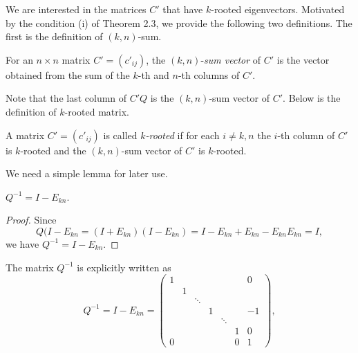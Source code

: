 \documentclass{beamer}
\begin{document}
\begin{frame}
    We are interested in the matrices $C'$ that have $k$-rooted eigenvectors.
Motivated by the condition (i) of Theorem 2.3, we provide the following two definitions.
The first is the definition of $(k,n)$-sum.
\begin{definition}
    For an $n \times n$ matrix $C'=(c'_{ij})$, the $(k, n)$-{\it sum vector} of $C'$ is the vector
     obtained from the sum of the $k$-th and  $n$-th columns of $C'$.
\end{definition}
Note that the last column of $C'Q$ is the $(k, n)$-sum vector of $C'$.
Below is the definition of $k$-rooted matrix.
\begin{definition}\label{m_rooted}
    A  matrix $C'=(c'_{ij})$ is called {\it $k$-rooted}  if for
     each $i\not=k, n$ the  $i$-th column of $C'$  is $k$-rooted
     and the $(k,n)$-sum vector of $C'$ is $k$-rooted.
\end{definition}
\end{frame}

\begin{frame}
    We need a simple lemma for later use.

\begin{lemma}
$Q^{-1}=I-E_{kn}.$
\end{lemma}

\begin{proof}
Since $$Q(I-E_{kn}=(I+E_{kn})(I-E_{kn})=I-E_{kn}+E_{kn}-E_{kn}E_{kn}=I,$$ we have
$Q^{-1}=I-E_{kn}$.
\end{proof}

\end{frame}

\begin{frame}
    The matrix $Q^{-1}$ is explicitly written as
    $$Q^{-1}=I-E_{kn}=
\begin{pmatrix}
1 &   &        &       &        &   & 0 \\
  & 1 &        &       &        &   &   \\
  &   & \ddots &       &        &   &   \\
  &   &        & 1     &        &   & -1 \\
  &   &        &       &\ddots  &   &  \\
  &   &        &       &        &1  & 0 \\
0 &   &        &       &        &0  & 1
\end{pmatrix},$$ 

\end{frame}
\end{document}
